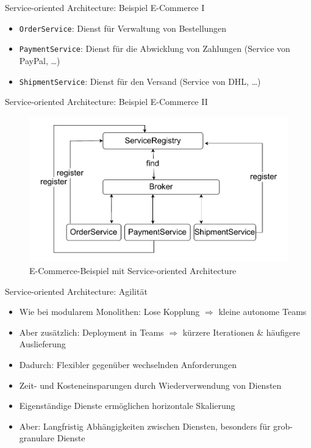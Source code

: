 \begin{frame}{Service-oriented Architecture: Beispiel E-Commerce I}
  \begin{itemize}
    \item \texttt{OrderService}: Dienst für Verwaltung von Bestellungen
    \item \texttt{PaymentService}: Dienst für die Abwicklung von Zahlungen (Service von PayPal, \ldots)
    \item \texttt{ShipmentService}: Dienst für den Versand (Service von DHL, \ldots)
  \end{itemize}
\end{frame}

\begin{frame}{Service-oriented Architecture: Beispiel E-Commerce II}
  \begin{figure}[!h]
    \centering
    \includegraphics[scale=0.55]{imglib/soa/soa-example}
    \caption{E-Commerce-Beispiel mit Service-oriented Architecture}
    \label{fig:soaecommerce}
  \end{figure}
\end{frame}

\begin{frame}{Service-oriented Architecture: Agilität}
  \begin{itemize}
    \item Wie bei modularem Monolithen: Lose Kopplung $\Rightarrow$ kleine autonome Teams
    \item Aber zusätzlich: Deployment in Teams $\Rightarrow$ kürzere Iterationen \& häufigere Auslieferung
    \item Dadurch: Flexibler gegenüber wechselnden Anforderungen
    \item Zeit- und Kosteneinsparungen durch Wiederverwendung von Diensten
    \item Eigenständige Dienste ermöglichen horizontale Skalierung
    \item Aber: Langfristig Abhängigkeiten zwischen Diensten, besonders für grob-granulare Dienste
    \end{itemize}
\end{frame}
